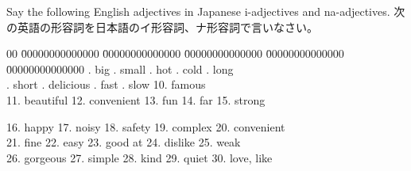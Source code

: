 \documentclass[uplatex,dvipdfmx,b5paper,english,10pt]{jsbook}
\begin{document}
\begin{toiquestion}
\ifEnglish
Say the following English adjectives in Japanese i-adjectives and na-adjectives.
\else
次の英語の形容詞を日本語のイ形容詞、ナ形容詞で言いなさい。
\fi
\end{toiquestion}
\begin{tabbing}
 00 \=
 00000000000000 \=
 00000000000000 \=
 00000000000000 \=
 00000000000000 \=
 00000000000000 \kill
 . big     . small   . hot     . cold    . long  \\
 . short  . delicious  . fast  . slow  \>
\hspace{-.5em}10. famous       \\
 \>
\hspace{-.5em}11. beautiful    \>
\hspace{-.5em}12. convenient   \>
\hspace{-.5em}13. fun      \>
\hspace{-.5em}14. far      \>
\hspace{-.5em}15. strong   \\
 \>

\hspace{-.5em}16. happy    \>
\hspace{-.5em}17. noisy        \>
\hspace{-.5em}18. safety       \>
\hspace{-.5em}19. complex      \>
\hspace{-.5em}20. convenient   \\

 \>
\hspace{-.5em}21. fine         \>
\hspace{-.5em}22. easy         \>
\hspace{-.5em}23. good at      \>
\hspace{-.5em}24. dislike      \>
\hspace{-.5em}25. weak         \\

 \>
\hspace{-.5em}26. gorgeous     \>
\hspace{-.5em}27. simple       \>
\hspace{-.5em}28. kind         \>
\hspace{-.5em}29. quiet        \>
\hspace{-.5em}30. love, like   \\

\end{tabbing}
\end{document}
